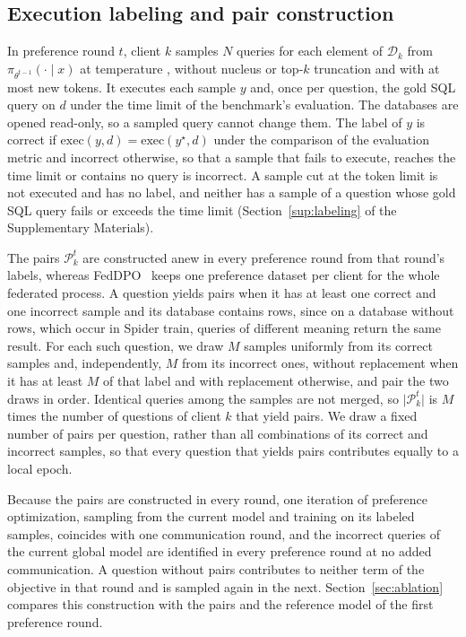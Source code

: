\subsection{Execution labeling and pair construction}\label{sec:labeling}\label{sec:pairs}

In preference round $t$, client $k$ samples $N$ queries for each element
of $\mathcal{D}_k$ from $\pi_{\theta^{t-1}}(\cdot \mid x)$ at
temperature , without nucleus or top-$k$ truncation and
with at most  new tokens. It executes each sample
$y$ and, once per question, the gold SQL query on $d$ under the time
limit of the benchmark's evaluation.
The databases are opened read-only, so a sampled query cannot change
them. The label of $y$ is correct if
$\mathrm{exec}(y, d) = \mathrm{exec}(y^\star, d)$ under the comparison
of the evaluation metric and incorrect otherwise, so that a sample that
fails to execute, reaches the time limit or contains no query is
incorrect. A sample cut at the token limit is not executed and has no
label, and neither has a sample of a question whose gold SQL query fails
or exceeds the time limit (Section~\ref{sup:labeling} of the
Supplementary Materials).

The pairs $\mathcal{P}_k^{t}$ are constructed anew in every preference
round from that round's labels, whereas FedDPO~\cite{ye2024openfedllm}
keeps one preference dataset per client for the whole federated
process. A question yields pairs when it has at least one correct and
one incorrect sample and its database contains rows, since on a database
without rows, which occur in Spider train, queries of different meaning
return the same result. For each such question, we draw $M$ samples
uniformly from its correct samples and, independently, $M$ from its
incorrect ones, without replacement when it has at least $M$ of that
label and with replacement otherwise, and pair the two draws in order.
Identical queries among the samples are not merged, so
$\lvert\mathcal{P}_k^{t}\rvert$ is $M$ times the number of questions of
client $k$ that yield pairs. We draw a fixed number of pairs per
question, rather than all combinations of its correct and incorrect
samples, so that every question that yields pairs contributes equally to
a local epoch.

Because the pairs are constructed in every round, one iteration of
preference optimization, sampling from the current model and training
on its labeled samples, coincides with one communication round, and the
incorrect queries of the current global model are identified in every
preference round at no added communication. A question without pairs
contributes to neither term of the objective in that round and is
sampled again in the next. Section~\ref{sec:ablation} compares this
construction with the pairs and the reference model of the first
preference round.

